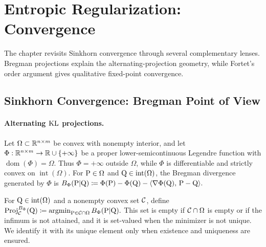 \section{Entropic Regularization: Convergence}
\label{sec-sinkhorn-advanced}
\label{sec-entropic-convergence}
\label{sec-convergence-dual}
The chapter revisits Sinkhorn convergence through several complementary lenses. Bregman projections explain the alternating-projection geometry, while Fortet's order argument gives qualitative fixed-point convergence.

\subsection{Sinkhorn Convergence: Bregman Point of View}
\label{sec-convergence-init}
\paragraph{\texorpdfstring{Alternating $\KL$ projections.}{Alternating KL projections.}}
\begin{defn}\label{def-bregman-divergence}
Let $\Omega\subset\RR^{n\times m}$ be convex with nonempty interior, and let $\Phi:\RR^{n\times m}\to\RR\cup\{+\infty\}$ be a proper lower-semicontinuous Legendre function with $\operatorname{dom}(\Phi)=\Omega$. Thus $\Phi=+\infty$ outside $\Omega$, while $\Phi$ is differentiable and strictly convex on $\operatorname{int}(\Omega)$. For $\P\in\Omega$ and $\Q\in\operatorname{int}(\Omega)$, the Bregman divergence generated by $\Phi$ is
\(B_\Phi(\P|\Q)\eqdef \Phi(\P)-\Phi(\Q)-\dotp{\nabla\Phi(\Q)}{\P-\Q}.\)
\end{defn}
\begin{defn}\label{def-bregman-projection}
For $\Q\in\operatorname{int}(\Omega)$ and a nonempty convex set $\Cc$, define
\(\Proj_{\Cc}^{B_\Phi}(\Q) \eqdef \argmin_{\P\in\Cc\cap\Omega} B_\Phi(\P|\Q).\)
This set is empty if $\Cc\cap\Omega$ is empty or if the infimum is not attained, and it is set-valued when the minimizer is not unique. We identify it with its unique element only when existence and uniqueness are ensured.
\end{defn}
